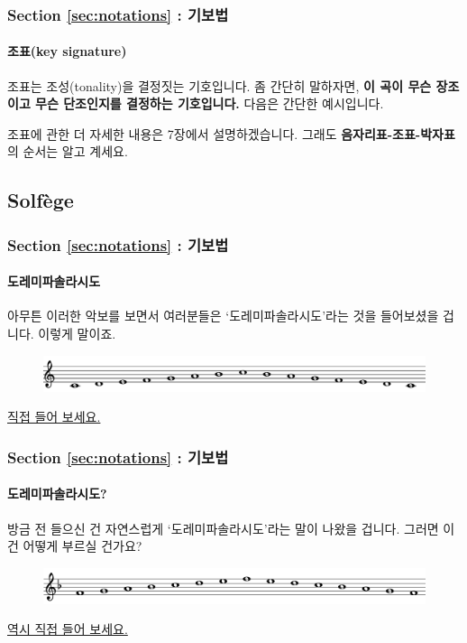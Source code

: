 \documentclass{beamer}
\begin{document}
	\begin{frame}
		\frametitle{Section \ref{sec:notations} : 기보법}
		\framesubtitle{조표(key signature)}
		조표는 조성(tonality)을 결정짓는 기호입니다. 좀 간단히 말하자면, {\bf 이 곡이 무슨 장조이고 무슨 단조인지를 결정하는 기호입니다.} 다음은 간단한 예시입니다.
		\begin{figure}[!h]
		\end{figure}
		조표에 관한 더 자세한 내용은 7장에서 설명하겠습니다. 그래도 {\bf 음자리표-조표-박자표}의 순서는 알고 계세요.
	\end{frame}
	
	\subsection{Solfège}
	\begin{frame}
		\frametitle{Section \ref{sec:notations} : 기보법}
		\framesubtitle{도레미파솔라시도}
		\flushleft
		아무튼 이러한 악보를 보면서 여러분들은 `도레미파솔라시도'라는 것을 들어보셨을 겁니다. 이렇게 말이죠.\\
		\begin{figure}[!h]
			\centering
			{\includegraphics[width=\textwidth]{res/pdf/4/syllable/doremi.pdf}}
		\end{figure}
		\centering
		\color{cyan}\href{run:res/mp3/4/syllable/doremi.mp3}{직접 들어 보세요.}	
	\end{frame}
	
	\begin{frame}
		\frametitle{Section \ref{sec:notations} : 기보법}
		\framesubtitle{도레미파솔라시도?}
		\flushleft
		방금 전 들으신 건 자연스럽게 `도레미파솔라시도'라는 말이 나왔을 겁니다. 그러면 이건 어떻게 부르실 건가요?\\
		\begin{figure}[!h]
			\centering
			{\includegraphics[width=\textwidth]{res/pdf/4/syllable/doremi_F.pdf}}
		\end{figure}
		\centering
		\color{cyan}\href{run:res/mp3/4/syllable/doremi_F.mp3}{역시 직접 들어 보세요.}	
	\end{frame}
	
\end{document}
